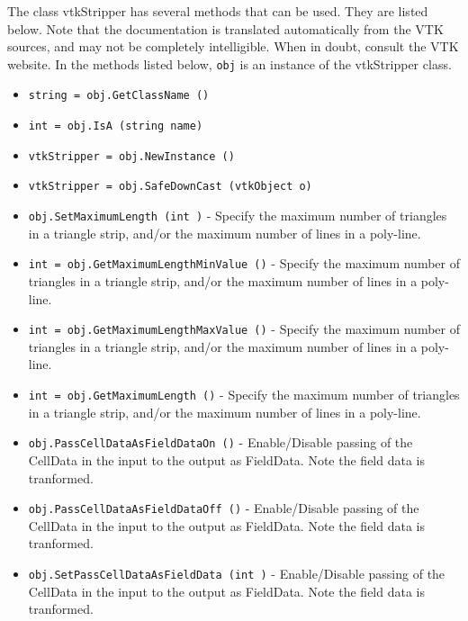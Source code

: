 The class vtkStripper has several methods that can be used.
  They are listed below.
Note that the documentation is translated automatically from the VTK sources,
and may not be completely intelligible.  When in doubt, consult the VTK website.
In the methods listed below, \verb|obj| is an instance of the vtkStripper class.
\begin{itemize}
\item  \verb|string = obj.GetClassName ()|

\item  \verb|int = obj.IsA (string name)|

\item  \verb|vtkStripper = obj.NewInstance ()|

\item  \verb|vtkStripper = obj.SafeDownCast (vtkObject o)|

\item  \verb|obj.SetMaximumLength (int )| -  Specify the maximum number of triangles in a triangle strip,
 and/or the maximum number of lines in a poly-line.

\item  \verb|int = obj.GetMaximumLengthMinValue ()| -  Specify the maximum number of triangles in a triangle strip,
 and/or the maximum number of lines in a poly-line.

\item  \verb|int = obj.GetMaximumLengthMaxValue ()| -  Specify the maximum number of triangles in a triangle strip,
 and/or the maximum number of lines in a poly-line.

\item  \verb|int = obj.GetMaximumLength ()| -  Specify the maximum number of triangles in a triangle strip,
 and/or the maximum number of lines in a poly-line.

\item  \verb|obj.PassCellDataAsFieldDataOn ()| -  Enable/Disable passing of the CellData in the input to
 the output as FieldData. Note the field data is tranformed.

\item  \verb|obj.PassCellDataAsFieldDataOff ()| -  Enable/Disable passing of the CellData in the input to
 the output as FieldData. Note the field data is tranformed.

\item  \verb|obj.SetPassCellDataAsFieldData (int )| -  Enable/Disable passing of the CellData in the input to
 the output as FieldData. Note the field data is tranformed.


\end{itemize}
